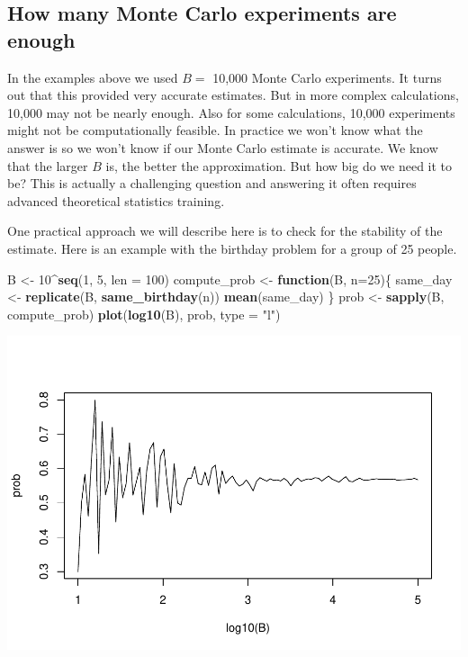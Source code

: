 \documentclass[
  openany]{book}
\newenvironment{Shaded}{\begin{snugshade}}{\end{snugshade}}
\newcommand{\ControlFlowTok}[1]{\textcolor[rgb]{0.13,0.29,0.53}{\textbf{#1}}}
\newcommand{\DataTypeTok}[1]{\textcolor[rgb]{0.13,0.29,0.53}{#1}}
\newcommand{\DecValTok}[1]{\textcolor[rgb]{0.00,0.00,0.81}{#1}}
\newcommand{\KeywordTok}[1]{\textcolor[rgb]{0.13,0.29,0.53}{\textbf{#1}}}
\newcommand{\NormalTok}[1]{#1}
\newcommand{\OperatorTok}[1]{\textcolor[rgb]{0.81,0.36,0.00}{\textbf{#1}}}
\newcommand{\StringTok}[1]{\textcolor[rgb]{0.31,0.60,0.02}{#1}}
\begin{document}
\hypertarget{how-many-monte-carlo-experiments-are-enough}{%
\subsection{How many Monte Carlo experiments are enough}\label{how-many-monte-carlo-experiments-are-enough}}

In the examples above we used \(B=\) 10,000 Monte Carlo experiments. It turns out that this provided very accurate estimates. But in more complex calculations, 10,000 may not be nearly enough. Also for some calculations, 10,000 experiments might not be computationally feasible. In practice we won't know what the answer is so we won't know if our Monte Carlo estimate is accurate. We know that the larger \(B\) is, the better the approximation. But how big do we need it to be? This is actually a challenging question and answering it often requires advanced theoretical statistics training.

One practical approach we will describe here is to check for the stability of the estimate. Here is an example with the birthday problem for a group of 25 people.

\begin{Shaded}
\begin{Highlighting}[]
\NormalTok{B <-}\StringTok{ }\DecValTok{10}\OperatorTok{^}\KeywordTok{seq}\NormalTok{(}\DecValTok{1}\NormalTok{, }\DecValTok{5}\NormalTok{, }\DataTypeTok{len =} \DecValTok{100}\NormalTok{)}
\NormalTok{compute_prob <-}\StringTok{ }\ControlFlowTok{function}\NormalTok{(B, }\DataTypeTok{n=}\DecValTok{25}\NormalTok{)\{}
\NormalTok{  same_day <-}\StringTok{ }\KeywordTok{replicate}\NormalTok{(B, }\KeywordTok{same_birthday}\NormalTok{(n))}
  \KeywordTok{mean}\NormalTok{(same_day)}
\NormalTok{\}}
\NormalTok{prob <-}\StringTok{ }\KeywordTok{sapply}\NormalTok{(B, compute_prob)}
\KeywordTok{plot}\NormalTok{(}\KeywordTok{log10}\NormalTok{(B), prob, }\DataTypeTok{type =} \StringTok{"l"}\NormalTok{)}
\end{Highlighting}
\end{Shaded}

\includegraphics{DataSciLibArts_files/figure-latex/unnamed-chunk-49-1.pdf}
\end{document}

